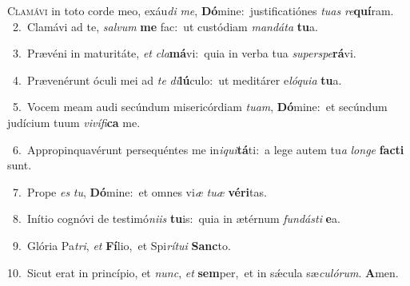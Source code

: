 \lettrine{\initial\textcolor{\initialcolor}{C}}{lamávi} in toto corde meo, exáu\textit{di} \textit{me}\-, \textbf{Dó}\-mine:~\star justificatiónes \textit{tu}\-\textit{as} \textit{re}\-\textbf{quí}ram.\\
{\numbfont\textcolor{\numbcolor}{~2.}}~Clamávi ad te, \textit{sal}\-\textit{vum} \textbf{me} fac:~\star ut custódiam \textit{man}\-\textit{dá}\textit{ta} \textbf{tu}\-a.\par
{\numbfont\textcolor{\numbcolor}{~3.}}~Prævéni in maturitáte, \textit{et} \textit{cla}\-\textbf{má}vi:~\star quia in verba tua \textit{su}\-\textit{per}\textit{spe}\textbf{rá}vi.\par
{\numbfont\textcolor{\numbcolor}{~4.}}~Prævenérunt óculi mei ad \textit{te} \textit{di}\-\textbf{lú}culo:~\star ut meditárer e\-\textit{ló}\-\textit{qui}\textit{a} \textbf{tu}\-a.\par
{\numbfont\textcolor{\numbcolor}{~5.}}~Vocem meam audi secúndum misericórdiam \textit{tu}\-\textit{am}, \textbf{Dó}\-mine:~\star et secúndum judícium tuum \textit{vi}\-\textit{ví}\textit{fi}\textbf{ca} me.\par
{\numbfont\textcolor{\numbcolor}{~6.}}~Appropinquavérunt persequéntes me in\-\textit{i}\-\textit{qui}\textbf{tá}ti:~\star a lege autem tu\textit{a} \textit{lon}\-\textit{ge} \textbf{fac}\-\textbf{ti} sunt.\par
{\numbfont\textcolor{\numbcolor}{~7.}}~Prope \textit{es} \textit{tu}\-, \textbf{Dó}\-mine:~\star et omnes vi\textit{æ} \textit{tu}\-\textit{æ} \textbf{vé}\-\textbf{ri}tas.\par
{\numbfont\textcolor{\numbcolor}{~8.}}~Inítio cognóvi de testimó\-\textit{ni}\-\textit{is} \textbf{tu}\-is:~\star quia in ætérnum \textit{fun}\-\textit{dás}\textit{ti} \textbf{e}\-a.\par
{\numbfont\textcolor{\numbcolor}{~9.}}~Glória Pa\-\textit{tri}\-, \textit{et} \textbf{Fí}\-lio,~\star et Spi\-\textit{rí}\-\textit{tu}\textit{i} \textbf{Sanc}\-to.\par
{\numbfont\textcolor{\numbcolor}{10.}}~Sicut erat in princípio, et \textit{nunc}\-, \textit{et} \textbf{sem}\-per,~\star et in sǽcula sæ\-\textit{cu}\-\textit{ló}\textit{rum}. \textbf{A}\-men.\par
